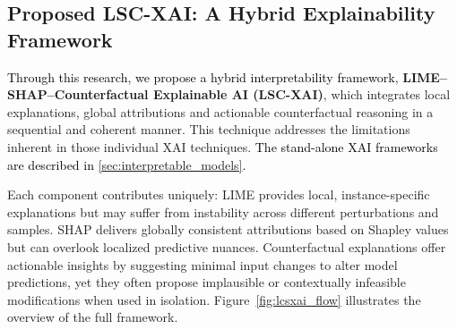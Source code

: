 \documentclass[a4paper,fleqn]{cas-sc}
\begin{document}
\newline

\subsection{Proposed LSC-XAI: A Hybrid Explainability Framework}
\label{sec:lsc_xai}

\textcolor{black}{Through this research, we propose a hybrid interpretability framework}, \textbf{LIME–SHAP–Counterfactual Explainable AI (LSC-XAI)}, which integrates local explanations, global attributions and actionable counterfactual reasoning in a sequential and coherent manner. This technique addresses the limitations inherent in those individual XAI techniques. \textcolor{black}{The stand-alone XAI frameworks are described in \cref{sec:interpretable_models}.}

Each component contributes uniquely: LIME provides local, instance-specific explanations but may suffer from instability across different perturbations and samples. SHAP delivers globally consistent attributions based on Shapley values but can overlook localized predictive nuances. Counterfactual explanations offer actionable insights by suggesting minimal input changes to alter model predictions, yet they often propose implausible or contextually infeasible modifications when used in isolation. Figure~\ref{fig:lcsxai_flow} illustrates the overview of the full framework. 
\end{document}
